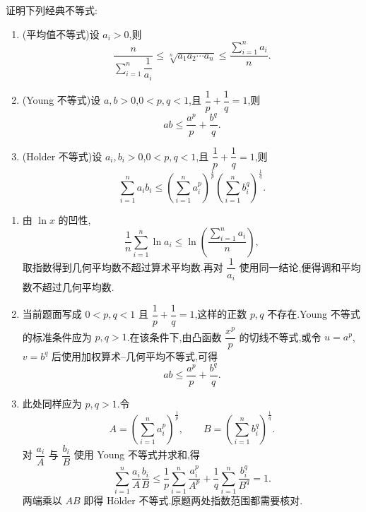 \begin{example}[\markstar]
    证明下列经典不等式:
    \begin{enumerate}
        \item (平均值不等式)设 $a_i>0$,则
              \[
                  \dfrac{n}{\displaystyle\sum\limits_{i=1}^n\dfrac{1}{a_i}}
                  \leq\sqrt[n]{a_1a_2\cdots a_n}
                  \leq\dfrac{\displaystyle\sum\limits_{i=1}^n a_i}{n}.
              \]
        \item (Young 不等式)设 $a,b>0$,$0<p,q<1$,且 $\dfrac{1}{p}+\dfrac{1}{q}=1$,则
              \[
                  ab\leq\dfrac{a^p}{p}+\dfrac{b^q}{q}.
              \]
        \item (Holder 不等式)设 $a_i,b_i>0$,$0<p,q<1$,且 $\dfrac{1}{p}+\dfrac{1}{q}=1$,则
              \[
                  \displaystyle\sum\limits_{i=1}^n a_i b_i
                  \leq
                  \left(\sum\limits_{i=1}^n a_i^p\right)^{\frac{1}{p}}
                  \left(\sum\limits_{i=1}^n b_i^q\right)^{\frac{1}{q}}.
              \]
    \end{enumerate}
\end{example}
\exampleblank

\begin{solution}
    \leavevmode
    \begin{enumerate}
        \item 由 $\ln x$ 的凹性,
              \[
                  \dfrac{1}{n}\sum\limits_{i=1}^{n}\ln a_i
                  \leq\ln\left(\dfrac{\displaystyle\sum\limits_{i=1}^{n}a_i}{n}\right),
              \]
              取指数得到几何平均数不超过算术平均数.再对 $\dfrac{1}{a_i}$ 使用同一结论,便得调和平均数不超过几何平均数.

        \item 当前题面写成 $0<p,q<1$ 且 $\dfrac{1}{p}+\dfrac{1}{q}=1$,这样的正数 $p,q$ 不存在.Young 不等式的标准条件应为 $p,q>1$.在该条件下,由凸函数 $\dfrac{x^p}{p}$ 的切线不等式,或令 $u=a^p$,$v=b^q$ 后使用加权算术--几何平均不等式,可得
              \[
                  ab\leq\dfrac{a^p}{p}+\dfrac{b^q}{q}.
              \]

        \item 此处同样应为 $p,q>1$.令
              \[
                  A=\left(\sum\limits_{i=1}^{n}a_i^p\right)^{\frac{1}{p}},
                  \qquad
                  B=\left(\sum\limits_{i=1}^{n}b_i^q\right)^{\frac{1}{q}}.
              \]
              对 $\dfrac{a_i}{A}$ 与 $\dfrac{b_i}{B}$ 使用 Young 不等式并求和,得
              \[
                  \displaystyle\sum\limits_{i=1}^{n}\dfrac{a_i}{A}\dfrac{b_i}{B}
                  \leq\dfrac{1}{p}\sum\limits_{i=1}^{n}\dfrac{a_i^p}{A^p}
                  +\dfrac{1}{q}\sum\limits_{i=1}^{n}\dfrac{b_i^q}{B^q}
                  =1.
              \]
              两端乘以 $AB$ 即得 Hölder 不等式.原题两处指数范围都需要核对.
    \end{enumerate}
\end{solution}
